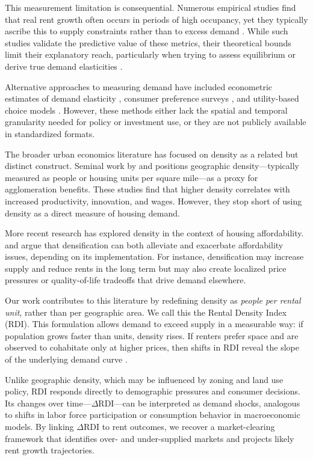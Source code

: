 \documentclass[APA,Times1COL]{WileyNJDv5} %
\begin{document}
This measurement limitation is consequential. Numerous empirical studies find that real rent growth often occurs in periods of high occupancy, yet they typically ascribe this to supply constraints rather than to excess demand \cite{goodman1992rental, wheaton1991realestate}. While such studies validate the predictive value of these metrics, their theoretical bounds limit their explanatory reach, particularly when trying to assess equilibrium or derive true demand elasticities \cite{pennington2021does, molloy2022housing}.

Alternative approaches to measuring demand have included econometric estimates of demand elasticity \cite{green2002measuring}, consumer preference surveys \cite{malpezzi1996rent}, and utility-based choice models \cite{rosenthal1997housing}. However, these methods either lack the spatial and temporal granularity needed for policy or investment use, or they are not publicly available in standardized formats.

The broader urban economics literature has focused on density as a related but distinct construct. Seminal work by \cite{glaeser2001cities} and \cite{duranton2004micro} positions geographic density---typically measured as people or housing units per square mile---as a proxy for agglomeration benefits. These studies find that higher density correlates with increased productivity, innovation, and wages. However, they stop short of using density as a direct measure of housing demand.

More recent research has explored density in the context of housing affordability. \cite{ahlfeldt2019economic} and \cite{albouy2015driving} argue that densification can both alleviate and exacerbate affordability issues, depending on its implementation. For instance, densification may increase supply and reduce rents in the long term but may also create localized price pressures or quality-of-life tradeoffs that drive demand elsewhere.

Our work contributes to this literature by redefining density as \textit{people per rental unit}, rather than per geographic area. We call this the Rental Density Index (RDI). This formulation allows demand to exceed supply in a measurable way: if population grows faster than units, density rises. If renters prefer space and are observed to cohabitate only at higher prices, then shifts in RDI reveal the slope of the underlying demand curve \cite{muth1969cities, molloy2022housing}.

Unlike geographic density, which may be influenced by zoning and land use policy, RDI responds directly to demographic pressures and consumer decisions. Its changes over time---\( \Delta \text{RDI} \)---can be interpreted as demand shocks, analogous to shifts in labor force participation or consumption behavior in macroeconomic models. By linking \( \Delta \text{RDI} \) to rent outcomes, we recover a market-clearing framework that identifies over- and under-supplied markets and projects likely rent growth trajectories.
\end{document}
